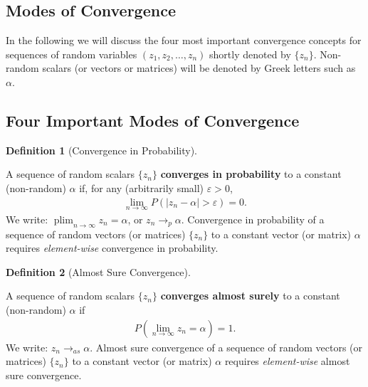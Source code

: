 \documentclass[
  letterpaper,
  DIV=11,
  numbers=noendperiod]{scrreprt}
\theoremstyle{definition}
\newtheorem{definition}{Definition}[chapter]
\theoremstyle{plain}
\theoremstyle{plain}
\theoremstyle{remark}
\begin{document}
\hypertarget{modes-of-convergence}{%
\subsection{Modes of Convergence}\label{modes-of-convergence}}

In the following we will discuss the four most important convergence
concepts for sequences of random variables \((z_1,z_2,\dots,z_n)\)
shortly denoted by \(\{z_n\}\). Non-random scalars (or vectors or
matrices) will be denoted by Greek letters such as \(\alpha\).

\hypertarget{four-important-modes-of-convergence}{%
\subsection*{Four Important Modes of
Convergence}\label{four-important-modes-of-convergence}}

\leavevmode{}%
\begin{definition}[Convergence in Probability]\label{def-conv_prop}

A sequence of random scalars \(\{z_n\}\) \textbf{converges in
probability} to a constant (non-random) \(\alpha\) if, for any
(arbitrarily small) \(\varepsilon>0\), \begin{eqnarray*}
  \lim_{n\to\infty} P\left(|z_n-\alpha|>\varepsilon\right)=0.
\end{eqnarray*} We write:
\(\operatorname{plim}_{n\to\infty}z_n=\alpha\), or \(z_n\to_{p}\alpha\).
Convergence in probability of a sequence of random vectors (or matrices)
\(\{z_n\}\) to a constant vector (or matrix) \(\alpha\) requires
\emph{element-wise} convergence in probability.

\end{definition}

\leavevmode{}%
\begin{definition}[Almost Sure Convergence]\label{def-conv_as}

A sequence of random scalars \(\{z_n\}\) \textbf{converges almost
surely} to a constant (non-random) \(\alpha\) if \begin{eqnarray*}
P\left(\lim_{n\to\infty}z_n=\alpha\right)=1.
\end{eqnarray*} We write: \(z_n\to_{as}\alpha\). Almost sure convergence
of a sequence of random vectors (or matrices) \(\{z_n\}\) to a constant
vector (or matrix) \(\alpha\) requires \emph{element-wise} almost sure
convergence.

\end{definition}
\end{document}
